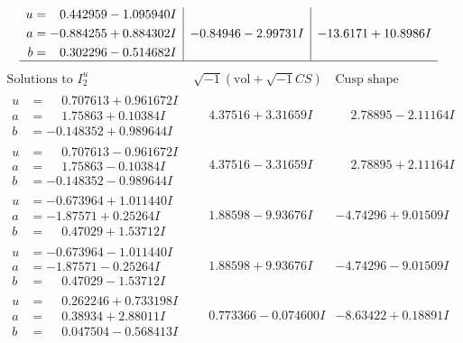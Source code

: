 \documentclass[1p]{elsarticle_modified}
\theoremstyle{definition}
\newcommand{\I}{\sqrt{-1}}
\begin{document}
$$\begin{array}{c|c|c}
\begin{aligned}
u &= \phantom{-}0.442959 - 1.095940 I \\
a &= -0.884255 + 0.884302 I \\
b &= \phantom{-}0.302296 - 0.514682 I\end{aligned}
 & -0.84946 - 2.99731 I & -13.6171 + 10.8986 I\\
 \hline 
 \end{array}$$\newpage$$\begin{array}{c|c|c}  
\text{Solutions to }I^u_{2}& \I (\text{vol} + \sqrt{-1}CS) & \text{Cusp shape}\\
 \hline 
\begin{aligned}
u &= \phantom{-}0.707613 + 0.961672 I \\
a &= \phantom{-}1.75863 + 0.10384 I \\
b &= -0.148352 + 0.989644 I\end{aligned}
 & \phantom{-}4.37516 + 3.31659 I & \phantom{-}2.78895 - 2.11164 I \\ \hline\begin{aligned}
u &= \phantom{-}0.707613 - 0.961672 I \\
a &= \phantom{-}1.75863 - 0.10384 I \\
b &= -0.148352 - 0.989644 I\end{aligned}
 & \phantom{-}4.37516 - 3.31659 I & \phantom{-}2.78895 + 2.11164 I \\ \hline\begin{aligned}
u &= -0.673964 + 1.011440 I \\
a &= -1.87571 + 0.25264 I \\
b &= \phantom{-}0.47029 + 1.53712 I\end{aligned}
 & \phantom{-}1.88598 - 9.93676 I & -4.74296 + 9.01509 I \\ \hline\begin{aligned}
u &= -0.673964 - 1.011440 I \\
a &= -1.87571 - 0.25264 I \\
b &= \phantom{-}0.47029 - 1.53712 I\end{aligned}
 & \phantom{-}1.88598 + 9.93676 I & -4.74296 - 9.01509 I \\ \hline\begin{aligned}
u &= \phantom{-}0.262246 + 0.733198 I \\
a &= \phantom{-}0.38934 + 2.88011 I \\
b &= \phantom{-}0.047504 - 0.568413 I\end{aligned}
 & \phantom{-}0.773366 - 0.074600 I & -8.63422 + 0.18891 I \\ \hline\begin{aligned}

\end{aligned}
\end{array}$$
\end{document}
